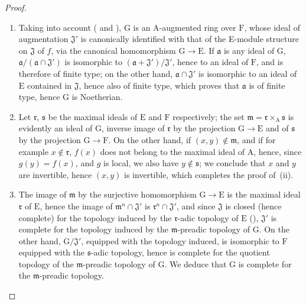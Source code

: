 \begin{proof}
\begin{enumerate}[label=(\roman*)]
  \item Taking into account ( and ), $\mathrm{G}$ is an A-augmented ring over $\mathrm{F}$, whose ideal of augmentation $\mathfrak{J}'$ is canonically identified with that of the E-module structure on $\mathfrak{J}$ of $f$, via the canonical homomorphism $\mathrm{G}\to\mathrm{E}$.
If $\mathfrak{a}$ is any ideal of $\mathrm{G}$, $\mathfrak{a}/(\mathfrak{a}\cap\mathfrak{J}')$ is isomorphic to $(\mathfrak{a}+\mathfrak{J}')/\mathfrak{J}'$, hence to an ideal of $\mathrm{F}$, and is therefore of finite type; on the other hand, $\mathfrak{a}\cap\mathfrak{J}'$ is isomorphic to an ideal of $\mathrm{E}$ contained in $\mathfrak{J}$, hence also of finite type, which proves that $\mathfrak{a}$ is of finite type, hence $\mathrm{G}$ is Noetherian.
  \item Let $\mathfrak{r}$, $\mathfrak{s}$ be the maximal ideals of $\mathrm{E}$ and $\mathrm{F}$ respectively; the set $\mathfrak{m}=\mathfrak{r}\times_{\mathrm{A}}\mathfrak{s}$ is evidently an ideal of $\mathrm{G}$, inverse image of $\mathfrak{r}$ by the projection $\mathrm{G}\to\mathrm{E}$ and of $\mathfrak{s}$ by the projection $\mathrm{G}\to\mathrm{F}$.
On the other hand, if $(x,y)\notin\mathfrak{m}$, and if for example $x\notin\mathfrak{r}$, $f(x)$ does not belong to the maximal ideal of $\mathrm{A}$, hence, since $g(y)=f(x)$, and $g$ is local, we also have $y\notin\mathfrak{s}$; we
conclude that $x$ and $y$ are invertible, hence $(x,y)$ is invertible, which completes the proof of~(ii).
  \item The image of $\mathfrak{m}$ by the surjective homomorphism $\mathrm{G}\to\mathrm{E}$ is the maximal ideal $\mathfrak{r}$ of $\mathrm{E}$, hence the image of $\mathfrak{m}^n\cap\mathfrak{J}'$ is $\mathfrak{r}^n\cap\mathfrak{J}'$, and since $\mathfrak{J}$ is closed (hence complete) for the topology induced by the $\mathfrak{r}$-adic topology of $\mathrm{E}$ (), $\mathfrak{J}'$ is complete for the topology induced by the $\mathfrak{m}$-preadic topology of $\mathrm{G}$.
On the other hand, $\mathrm{G}/\mathfrak{J}'$, equipped with the topology induced, is isomorphic to $\mathrm{F}$ equipped with the $\mathfrak{s}$-adic topology, hence is complete for the quotient topology of the $\mathfrak{m}$-preadic topology of $\mathrm{G}$.
We deduce that $\mathrm{G}$ is complete for the $\mathfrak{m}$-preadic topology.
\end{enumerate}


\end{proof}
